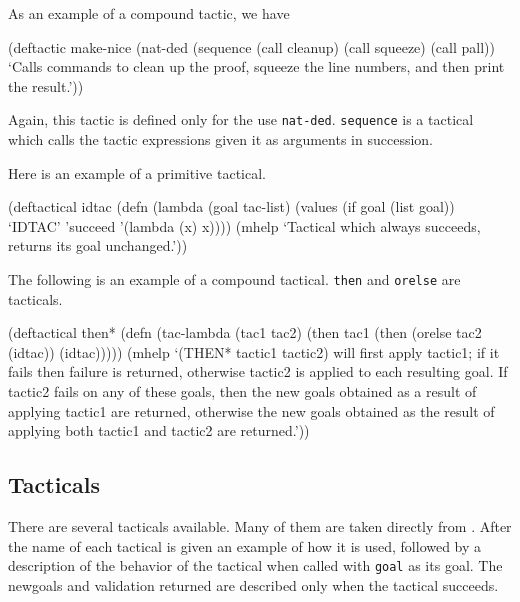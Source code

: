 As an example of a compound tactic, we have
\begin{lispcode}
(deftactic make-nice
  (nat-ded
   (sequence (call cleanup) (call squeeze) (call pall))
   `Calls commands to clean up the proof, squeeze the line
numbers, and then print the result.'))
\end{lispcode}

Again, this tactic is defined only for the use {\tt nat-ded}.  {\tt sequence} is
a tactical which calls the tactic expressions given it as arguments
in succession.

Here is an example of a primitive tactical.
\begin{lispcode}
(deftactical idtac
  (defn
    (lambda (goal tac-list)
      (values (if goal (list goal)) `IDTAC' 'succeed
	      '(lambda (x) x))))
  (mhelp `Tactical which always succeeds, returns its goal
unchanged.'))
\end{lispcode}

The following is an example of a compound tactical.  {\tt then} and {\tt orelse} are tacticals.

\begin{lispcode}
(deftactical then*
  (defn
    (tac-lambda (tac1 tac2)
      (then tac1 (then (orelse tac2 (idtac)) (idtac)))))
  (mhelp `(THEN* tactic1 tactic2) will first apply tactic1; if it
fails then failure is returned, otherwise tactic2 is applied to
each resulting goal.  If tactic2 fails on any of these goals,
then the new goals obtained as a result of applying tactic1 are
returned, otherwise the new goals obtained as the result of
applying both tactic1 and tactic2 are returned.'))
\end{lispcode}

\subsection{Tacticals}
There are several tacticals available.  Many of them are taken directly from
\cite{GORDON79}.  After the name of each tactical is given
an example of how it is used, followed by a description of the behavior
of the tactical
when called with {\tt goal} as its goal.  The newgoals and validation returned
are described only when the tactical succeeds.


